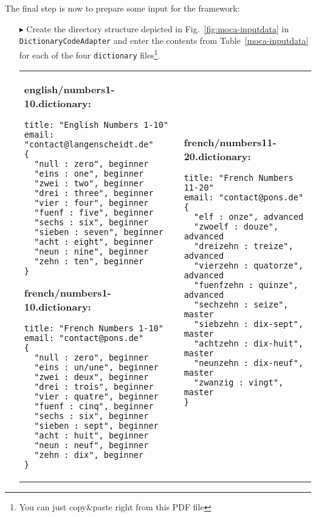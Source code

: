 The final step is now to prepare some input for the framework:
\begin{enumerate}
  \item[$\blacktriangleright$] Create the directory structure depicted in Fig.~\ref{fig:moca-inputdata} in \texttt{Dictionary\-Code\-Adapter} and enter the contents from Table~\ref{moca-inputdata} for each of the four \texttt{dictionary} files\footnote{You can just copy\&paste right from this PDF file}.
 

\begin{table}
\begin{tabular}{p{6cm} p{6cm} }
\footnotesize
\textbf{english/numbers1-10.dictionary:}
\begin{verbatim}
title: "English Numbers 1-10"
email: "contact@langenscheidt.de"	
{
  "null : zero", beginner
  "eins : one", beginner
  "zwei : two", beginner
  "drei : three", beginner
  "vier : four", beginner
  "fuenf : five", beginner
  "sechs : six", beginner
  "sieben : seven", beginner
  "acht : eight", beginner
  "neun : nine", beginner
  "zehn : ten", beginner 
}
\end{verbatim} 

\textbf{french/numbers1-10.dictionary:}
\begin{verbatim}   
title: "French Numbers 1-10"
email: "contact@pons.de"	
{
  "null : zero", beginner
  "eins : un/une", beginner
  "zwei : deux", beginner
  "drei : trois", beginner
  "vier : quatre", beginner
  "fuenf : cinq", beginner
  "sechs : six", beginner
  "sieben : sept", beginner
  "acht : huit", beginner
  "neun : neuf", beginner
  "zehn : dix", beginner 
}
\end{verbatim}
&

\footnotesize
\textbf{french/numbers11-20.dictionary:}
\begin{verbatim}
title: "French Numbers 11-20"
email: "contact@pons.de"	
{
  "elf : onze", advanced
  "zwoelf : douze", advanced
  "dreizehn : treize", advanced
  "vierzehn : quatorze", advanced
  "fuenfzehn : quinze", advanced
  "sechzehn : seize", master
  "siebzehn : dix-sept", master
  "achtzehn : dix-huit", master
  "neunzehn : dix-neuf", master
  "zwanzig : vingt", master
}


\end{verbatim}
\end{tabular}
\end{table}
\end{enumerate}
